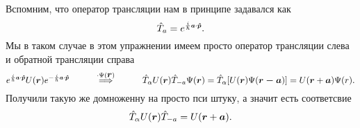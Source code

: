 Вспомним, что оператор трансляции нам в принципе задавался как
\begin{equation*}
	\hat{T}_a = e^{\frac{i}{\hbar} \smallvc{a} \cdot \smallvc{\hat{p}}}.
\end{equation*}
Мы в таком случае в этом упражнении имеем просто оператор трансляции слева и обратной трансляции справа
\begin{equation*}
	e^{\frac{i}{\hbar} \smallvc{a} \cdot \smallvc{\hat{p}}} U(\vc{r}) e^{-\frac{i}{\hbar} \smallvc{a} \cdot \smallvc{\hat{p}}}
	\hspace{1 cm}
	\overset{\cdot \Psi(\vc{r})}{\Longrightarrow}
	\hspace{1 cm}
	\hat{T}_\alpha U(\vc{r}) \hat{T}_{-a} \Psi(\vc{r})
	=
	\hat{T}_\alpha [U(\vc{r}) \Psi(\vc{r-a})]
	=
	U(\vc{r} + \vc{a})\Psi(r).
\end{equation*}
Получили такую же домноженну на просто пси штуку, а значит есть соответсвие
\begin{equation*}
	\hat{T}_\alpha U(\mbox{\boldmath $r$}) \hat{T}_{-a}  = U(\mbox{\boldmath $r$} + \mbox{\boldmath $a$}).
\end{equation*}
